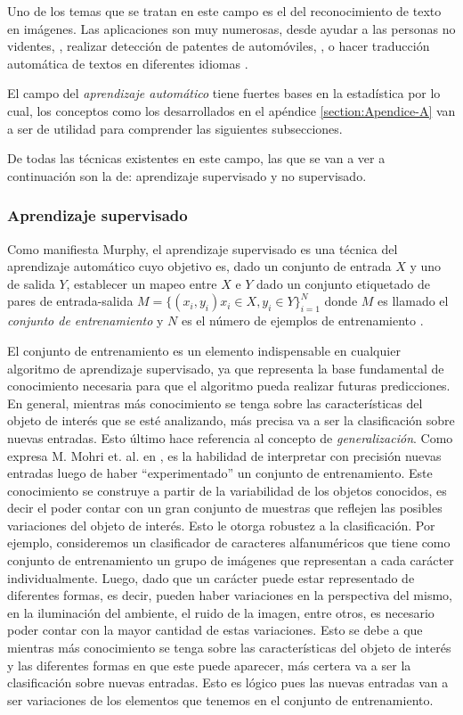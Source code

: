 	Uno de los temas que se tratan en este campo es el del reconocimiento de texto en imágenes. Las aplicaciones son muy numerosas, desde ayudar a las personas no videntes, \cite{Optelec}, realizar detección de patentes de automóviles, \cite{DAB}, o hacer traducción automática de textos en diferentes idiomas \cite{WordLens}.
	 
	 El campo del \textit{aprendizaje automático} tiene fuertes bases en la estadística por lo cual, los conceptos como los desarrollados en el apéndice \ref{section:Apendice-A} van a ser de utilidad para comprender las siguientes subsecciones.
	 
	 De todas las técnicas existentes en este campo, las que se van a ver a continuación son la de: aprendizaje supervisado y no supervisado.
	 	
	\subsubsection{Aprendizaje supervisado}
	
	Como manifiesta Murphy, el aprendizaje supervisado es una técnica del aprendizaje automático cuyo objetivo es, dado un conjunto de entrada $X$ y uno de salida $Y$, establecer un mapeo entre $X$ e $Y$ dado un conjunto etiquetado de pares de entrada-salida $M=\{(x_i,y_i) x_i \in X, y_i \in Y \}^{N}_{i=1}$ donde $M$ es llamado el \textit{conjunto de entrenamiento} y $N$ es el número de ejemplos de entrenamiento \cite{Murphy12}.
	
	El conjunto de entrenamiento es un elemento indispensable en cualquier algoritmo de aprendizaje supervisado, ya que representa la base fundamental de conocimiento necesaria para que el algoritmo pueda realizar futuras predicciones. En general, mientras más conocimiento se tenga sobre las ca\-rac\-te\-rís\-ti\-cas del objeto de interés que se esté analizando, más precisa va a ser la clasificación sobre nuevas entradas. Esto último hace referencia al concepto de \textit{generalización}. Como expresa M. Mohri et. al. en \cite{MMohri}, es la habilidad de interpretar con precisión nuevas entradas luego de haber ``experimentado'' un conjunto de entrenamiento. Este conocimiento se construye a partir de la variabilidad de los objetos conocidos, es decir el poder contar con un gran conjunto de muestras que reflejen las posibles variaciones del objeto de interés. Esto le otorga robustez a la clasificación. Por ejemplo, con\-si\-de\-re\-mos un clasificador de caracteres alfanuméricos que tiene como conjunto de entrenamiento un grupo de imágenes que representan a cada carácter individualmente. Luego, dado que un carácter puede estar representado de diferentes formas, es decir, pueden haber variaciones en la perspectiva del mismo, en la iluminación del ambiente, el ruido de la imagen, entre otros, es necesario poder contar con la mayor cantidad de estas variaciones. Esto se debe a que mientras más conocimiento se tenga sobre las características del objeto de interés y las diferentes formas en que este puede aparecer, más certera va a ser la clasificación sobre nuevas entradas. Esto es lógico pues las nuevas entradas van a ser variaciones de los elementos que tenemos en el conjunto de entrenamiento.
	

